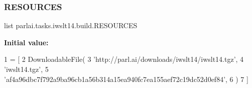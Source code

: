 \subsubsection{\texorpdfstring{R\+E\+S\+O\+U\+R\+C\+ES}{RESOURCES}}
{\footnotesize\ttfamily list parlai.\+tasks.\+iwslt14.\+build.\+R\+E\+S\+O\+U\+R\+C\+ES}

{\bfseries Initial value\+:}
\begin{DoxyCode}
1 =  [
2     DownloadableFile(
3         \textcolor{stringliteral}{'http://parl.ai/downloads/iwslt14/iwslt14.tgz'},
4         \textcolor{stringliteral}{'iwslt14.tgz'},
5         \textcolor{stringliteral}{'af4a96dbc7f792a9ba96cb1a56b314a15ea940fc7ea155aef72c19dc52d0ef84'},
6     )
7 ]
\end{DoxyCode}
